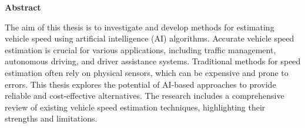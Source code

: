 \documentclass[12pt, a4paper, titlepage, onehalfspacing]{report}
\begin{document}
\vspace*{\fill}
\begin{center}
\textbf{Abstract}\par
\end{center}
\vspace{0.8\baselineskip}
The aim of this thesis is to investigate and develop methods for estimating vehicle speed using artificial intelligence (AI) algorithms. Accurate vehicle speed estimation is crucial for various applications, including traffic management, autonomous driving, and driver assistance systems. Traditional methods for speed estimation often rely on physical sensors, which can be expensive and prone to errors. This thesis explores the potential of AI-based approaches to provide reliable and cost-effective alternatives. The research includes a comprehensive review of existing vehicle speed estimation techniques, highlighting their strengths and limitations. 
\vspace*{\fill}









 



\printbibliography %

\listoffigures %

\listoftables %
\end{document}
